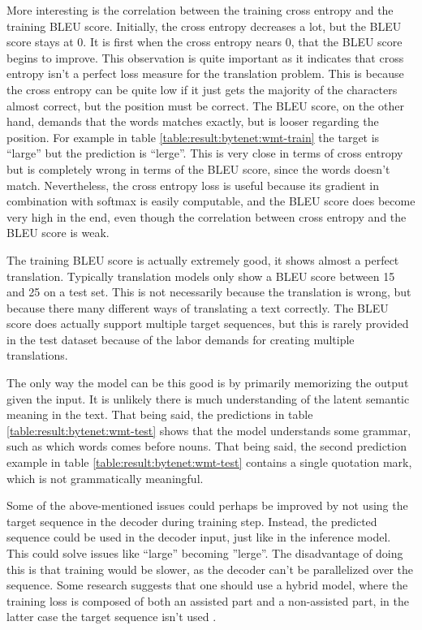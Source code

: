More interesting is the correlation between the training cross entropy and the training BLEU score. Initially, the cross entropy decreases a lot, but the BLEU score stays at 0. It is first when the cross entropy nears 0, that the BLEU score begins to improve. This observation is quite important as it indicates that cross entropy isn't a perfect loss measure for the translation problem. This is because the cross entropy can be quite low if it just gets the majority of the characters almost correct, but the position must be correct. The BLEU score, on the other hand, demands that the words matches exactly, but is looser regarding the position. For example in table \ref{table:result:bytenet:wmt-train} the target is ``large'' but the prediction is ``lerge''. This is very close in terms of cross entropy but is completely wrong in terms of the BLEU score, since the words doesn't match. Nevertheless, the cross entropy loss is useful because its gradient in combination with softmax is easily computable, and the BLEU score does become very high in the end, even though the correlation between cross entropy and the BLEU score is weak.

The training BLEU score is actually extremely good, it shows almost a perfect translation. Typically translation models only show a BLEU score between 15 and 25 on a test set. This is not necessarily because the translation is wrong, but because there many different ways of translating a text correctly. The BLEU score does actually support multiple target sequences, but this is rarely provided in the test dataset because of the labor demands for creating multiple translations.

The only way the model can be this good is by primarily memorizing the output given the input. It is unlikely there is much understanding of the latent semantic meaning in the text. That being said, the predictions in table \ref{table:result:bytenet:wmt-test} shows that the model understands some grammar, such as which words comes before nouns. That being said, the second prediction example in table \ref{table:result:bytenet:wmt-test} contains a single quotation mark, which is not grammatically meaningful. 

Some of the above-mentioned issues could perhaps be improved by not using the target sequence in the decoder during training step. Instead, the predicted sequence could be used in the decoder input, just like in the inference model. This could solve issues like ``large'' becoming ''lerge''. The disadvantage of doing this is that training would be slower, as the decoder can't be parallelized over the sequence. Some research suggests that one should use a hybrid model, where the training loss is composed of both an assisted part and a non-assisted part, in the latter case the target sequence isn't used \cite{no-assist-train}.

